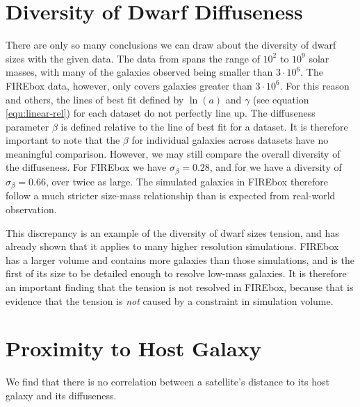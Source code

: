 \section{Diversity of Dwarf Diffuseness}

There are only so many conclusions we can draw about the diversity of dwarf sizes with the given data. The data from \cite{mcconnachieOBSERVEDPROPERTIESDWARF2012} spans the range of $10^2$ to $10^9$ solar masses, with many of the galaxies observed being smaller than $3 \cdot 10^6$. The FIREbox data, however, only covers galaxies greater than $3 \cdot 10^6$. For this reason and others, the lines of best fit defined by $\ln(a)$ and $\gamma$ (see equation \ref{equ:linear-rel}) for each dataset do not perfectly line up. %
The diffuseness parameter $\beta$ is defined relative to the line of best fit for a dataset. It is therefore important to note that the $\beta$ for individual galaxies across datasets have no meaningful comparison. However, we may still compare the overall diversity of the diffuseness. For FIREbox we have $\sigma_\beta = 0.28$, and for \cite{mcconnachieOBSERVEDPROPERTIESDWARF2012} we have a diversity of $\sigma_\beta = 0.66$, over twice as large. The simulated galaxies in FIREbox therefore follow a much stricter size-mass relationship than is expected from real-world observation.

This discrepancy is an example of the diversity of dwarf sizes tension, and \cite{salesBaryonicSolutionsChallenges2022} has already shown that it applies to many higher resolution simulations. FIREbox has a larger volume and contains more galaxies than those simulations, and is the first of its size to be detailed enough to resolve low-mass galaxies. It is therefore an important finding that the tension is not resolved in FIREbox, because that is evidence that the tension is \emph{not} caused by a constraint in simulation volume.


\section{Proximity to Host Galaxy}

We find that there is no correlation between a satellite's distance to its host galaxy and its diffuseness. 

